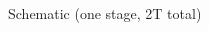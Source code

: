 \begin{center}
    Schematic (one stage, 2T total)
    \begin{figure}[h] %
        \begin{center}
            \begin{circuitdiagram}{10}{15}
            \end{circuitdiagram}
        \end{center}
    \end{figure}
\end{center}
